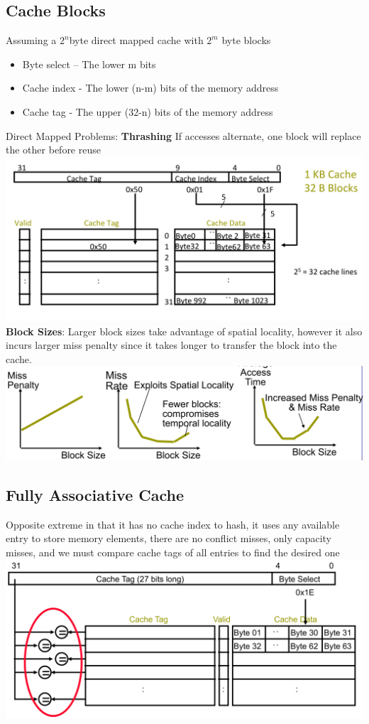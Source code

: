 \subsection*{Cache Blocks}
Assuming a $2^n$byte direct mapped cache with $2^m$ byte blocks
\begin{itemize}
\item Byte select – The lower m bits
\item Cache index - The lower (n-m) bits of the memory address
\item Cache tag - The upper (32-n) bits of the memory address
\end{itemize}
Direct Mapped Problems: \textbf{Thrashing} If accesses alternate, one block will
replace the other before reuse\\
\includegraphics[width=\linewidth]{png/cacheblock.png}
\textbf{Block Sizes}: Larger block sizes take advantage of spatial locality,
however it also incurs larger miss penalty since it takes longer to transfer
the block into the cache.
\includegraphics[width=\linewidth]{png/block.png}

\subsection*{Fully Associative Cache}
Opposite extreme in that it has no cache index to hash, it uses any available
entry to store memory elements, there are no conflict misses, only capacity
misses, and we must compare cache tags of all entries to find the desired one \\
\includegraphics[width=\linewidth]{png/fully.png}


